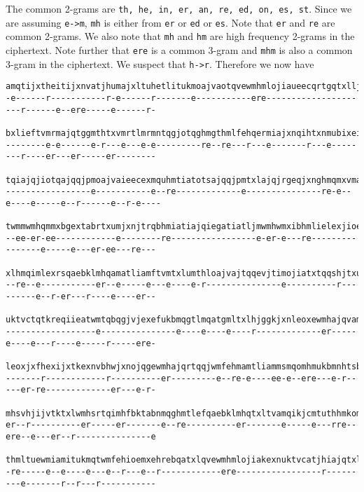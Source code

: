 The common 2-grams are \verb!th, he, in, er, an, re, ed, on, es, st!.
Since we are assuming \verb!e->m!, \verb!mh! is either from \verb!er! or \verb!ed! or \verb!es!.
Note that \verb!er! and \verb!re! are common 2-grams.
We also note that \verb!mh! and \verb!hm! are high frequency 2-grams in the ciphertext.
Note further that \verb!ere! is a common 3-gram and \verb!mhm! is also a common 3-gram in the ciphertext.
We suspect that \verb!h->r!.
Therefore we now have
  \begin{Verbatim}[frame=single,fontsize=\tiny]
amqtijxtheitijxnvatjhumajxltuhetlitukmoajvaotqvewmhmlojiaueecqrtgqtxlljtnhtrqtqjmximhmlajqqmtiqgbxhe
-e------r-----------r-e------r-------e-----------ere---------------------r------e--ere-----e------r-

bxlieftvmrmajqtggmthtxvmrtlmrmntqgjotqghmgthmlfehqermiajxnqihtxnmubixeifehqeewmhgeomhjxntgmhqextkjis
--------e-e------e-r---e---e-e---------re--re---r---e-------r---e--------r----er---er-----er--------

tqiajqjiotqajqqjpmoajvaieecexmquhmtiatotsajqqjpmtxlajqjrgeqjxnghmqmxvmajqamtlotqmxehrebqiamkthnmqija
-----------------e-----------e--re-------------e---------------re-e--e----e-----e--r------e--r-e----

twmmwmhqmmxbgextabrtxumjxnjtrqbhmiatiajqiegatiatljmwmhwmxibhmlielexjioebklatwmqkjggmlewmhrmmxijhmkst
--ee-er-ee------------e--------re-----------------e-er-e---re----------------e-----e---er-ee---re---

xlhmqimlexrsqaebklmhqamatliamftvmtxlumthloajvajtqqevjtimojiatxtqqshjtxubkkiamfehrmhfkehjliamktiimhqe
--re--e-----------er--e-----e---e----e-r---------------e----------r---------e--r-er---r----e----er--

uktvctqtkreqiieatwmtqbqgjvjexefukbmqgtlmqatgmltxlhjggkjxnleoxewmhajqvamqiiamatjhotqgmvbkjthgktqimhml
------------------e---------------e----e----e----r-------------er-----e----e---r----e-----r-----ere-

leoxjxfhexijxtkexnvbhwjxnojqgewmhajqrtqqjwmfehmamtliammsmqomhmukbmnhtsbxlmhnhmtiuktvcibfiqwmhsvkmthw
-------r------------r----------er---------e--re-e----ee-e--ere---e-r-----er-re-------------er---e-r-

mhsvhjijvtktxlwmhsrtqimhfbktabnmqghmtlefqaebklmhqtxltvamqikjcmtuthhmkomhmiameiamhgthiqefajroajvatggm
er--r----------er-----er-------e--re----------er-------e-----e---rre--ere--e---er--r---------------e

thmltuewmiamitukmqtwmfehioemxehrebqatxlqvewmhmlojiakexnuktvcatjhiajqtxltumkkeojxnhethjxnhbrukjxnwejv
-re-----e--e----e---e--r---e--r------------ere-----------------r---------e-------r--r---r-----------


\end{Verbatim}
